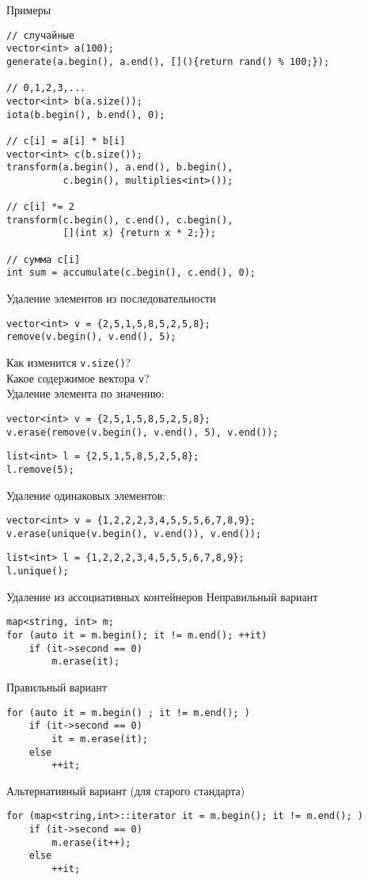 \documentclass{beamer}
\begin{document}
\begin{frame}[fragile]{Примеры}
\begin{lstlisting}
// случайныe
vector<int> a(100); 
generate(a.begin(), a.end(), [](){return rand() % 100;});

// 0,1,2,3,...
vector<int> b(a.size()); 
iota(b.begin(), b.end(), 0);

// c[i] = a[i] * b[i]
vector<int> c(b.size()); 
transform(a.begin(), a.end(), b.begin(), 
          c.begin(), multiplies<int>());

// c[i] *= 2 
transform(c.begin(), c.end(), c.begin(), 
          [](int x) {return x * 2;});

// сумма c[i]
int sum = accumulate(c.begin(), c.end(), 0);
\end{lstlisting}
\end{frame}

\begin{frame}[fragile]{Удаление элементов из последовательности}
\begin{lstlisting}
vector<int> v = {2,5,1,5,8,5,2,5,8};
remove(v.begin(), v.end(), 5);
\end{lstlisting}
Как изменится \texttt{v.size()}?\quad {}\\ 
Какое содержимое вектора \texttt{v}?\quad {}
\pause\pause\\\medskip
Удаление элемента по значению:
\begin{lstlisting}
vector<int> v = {2,5,1,5,8,5,2,5,8};
v.erase(remove(v.begin(), v.end(), 5), v.end());
\end{lstlisting}
\begin{lstlisting}
list<int> l = {2,5,1,5,8,5,2,5,8};
l.remove(5);
\end{lstlisting}
\pause
Удаление одинаковых элементов:
\begin{lstlisting}
vector<int> v = {1,2,2,2,3,4,5,5,5,6,7,8,9};
v.erase(unique(v.begin(), v.end()), v.end());
\end{lstlisting}
\begin{lstlisting}
list<int> l = {1,2,2,2,3,4,5,5,5,6,7,8,9};
l.unique();
\end{lstlisting}
\end{frame}


\begin{frame}[fragile]{Удаление из ассоциативных контейнеров}
Неправильный вариант
\begin{lstlisting}
map<string, int> m;
for (auto it = m.begin(); it != m.end(); ++it)
    if (it->second == 0)
        m.erase(it);
\end{lstlisting}
\pause
Правильный вариант
\begin{lstlisting}
for (auto it = m.begin() ; it != m.end(); )
    if (it->second == 0) 
        it = m.erase(it);
    else
        ++it;
\end{lstlisting}
\pause
Альтернативный вариант (для старого стандарта)
\begin{lstlisting}
for (map<string,int>::iterator it = m.begin(); it != m.end(); )
    if (it->second == 0) 
        m.erase(it++);
    else                 
        ++it;
\end{lstlisting}
\end{frame}
\end{document}
